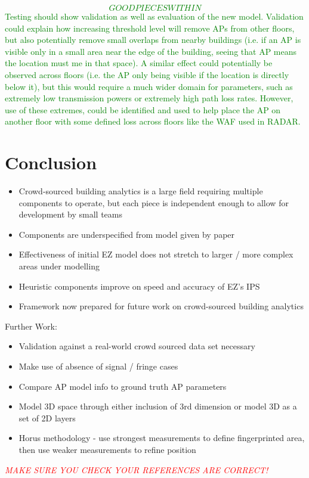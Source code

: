 \documentclass{UoYCSproject}
\begin{document}
		\textcolor{green}{\emph{\[GOOD PIECES WITHIN\]}Testing should show validation as well as evaluation of the new model. Validation could explain how increasing threshold level will remove APs from other floors, but also potentially remove small overlaps from nearby buildings (i.e. if an AP is visible only in a small area near the edge of the building, seeing that AP means the location must me in that space). A similar effect could potentially be observed across floors (i.e. the AP only being visible if the location is directly below it), but this would require a much wider domain for parameters, such as extremely low transmission powers or extremely high path loss rates. However, use of these extremes, could be identified and used to help place the AP on another floor with some defined loss across floors like the WAF used in RADAR.}
	
	\chapter{Conclusion}
    \label{chap:conclusion}
    
	    \begin{itemize}
	    	\item Crowd-sourced building analytics is a large field requiring multiple components to operate, but each piece is independent enough to allow for development by small teams
	    	\item Components are underspecified from model given by paper
	    	\item Effectiveness of initial EZ model does not stretch to larger / more complex areas under modelling
	    	\item Heuristic components improve on speed and accuracy of EZ's IPS
	    	\item Framework now prepared for future work on crowd-sourced building analytics
	    \end{itemize}
	    
	    Further Work:
	    \begin{itemize}
	    	\item Validation against a real-world crowd sourced data set necessary
	    	\item Make use of absence of signal / fringe cases
	    	\item Compare AP model info to ground truth AP parameters
	    	\item Model 3D space through either inclusion of 3rd dimension or model 3D as a set of 2D layers
	    	\item Horus methodology - use strongest measurements to define fingerprinted area, then use weaker measurements to refine position
	    \end{itemize}
    
    \textcolor{red}{\emph{MAKE SURE YOU CHECK YOUR REFERENCES ARE CORRECT!}}
        
    
	
\end{document}
